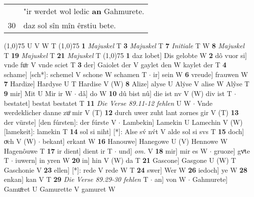 \documentclass[8pt,a4paper,notitlepage]{article}
\begin{document}
\begin{table}[ht]
\begin{minipage}[t]{0.5\linewidth}
\begin{tabular}{rl}
 & "ir werdet wol ledic \textbf{an} Gahmurete.\\ 
30 & daz sol sîn mîn êrstiu bete.\\ 
\end{tabular}
\scriptsize
\line(1,0){75} \newline
U V W T \newline
\line(1,0){75} \newline
\textbf{1} \textit{Majuskel} T  \textbf{3} \textit{Majuskel} T  \textbf{7} \textit{Initiale} T W  \textbf{8} \textit{Majuskel} T  \textbf{19} \textit{Majuskel} T  \textbf{21} \textit{Majuskel} T  \newline
\line(1,0){75} \newline
\textbf{1} daz lobet] Dis gelobte W \textbf{2} dô vuor si] vnde fuͦr V vnde sciet T \textbf{3} der] Gaiolet der V gaylet den W kaylet der T \textbf{4} schame] [sch*]: schemel V schone W schamen T  $\cdot$ ir] sein W \textbf{6} vreude] frauwen W \textbf{7} Hardize] Hardyse U T Hardise V (W) \textbf{8} Alize] alyse U Alẏse V alise W Alŷse T \textbf{9} mir] Mit U Mir ir W  $\cdot$ dâ] do W \textbf{10} dû bist nû] die ist nv V (W) div ist T  $\cdot$ bestatet] bestat bestatet T \textbf{11} \textit{Die Verse 89.11-12 fehlen} U W   $\cdot$ Vnde werdeklicher danne zuͦ mir V (T) \textbf{12} durch uwer zuht lant zornes gir V (T) \textbf{13} der vürste] [den fúrsten]: der fúrste V  $\cdot$ Lambekin] Lamekin U Lamechin V (W) [lamekeit]: lamekin  T \textbf{14} sol si niht] [*]: Alse sv́ nv́t V alde sol si svs T \textbf{15} doch] oͮch V (W)  $\cdot$ bekant] erkant W \textbf{16} Hanouwe] Hanegowe U (V) Hennowe W Hagenôuwe T \textbf{17} ir dient] dient ir T  $\cdot$ und] \textit{om.} V \textbf{18} mir] mir es W  $\cdot$ gruoze] gvͦte T  $\cdot$ iuwern] in yren W \textbf{20} in] hin V (W) da T \textbf{21} Gascone] Gasgone U (W) T Gaschonie V \textbf{23} ellen] [*]: rede V rede W T \textbf{24} swer] Wer W \textbf{26} iedoch] ye W \textbf{28} enkan] kan V T \textbf{29} \textit{Die Verse 89.29-30 fehlen} T   $\cdot$ an] von W  $\cdot$ Gahmurete] Gamuͦret U Gamurette V gamuret W \newline
\end{minipage}
\end{table}
\end{document}
